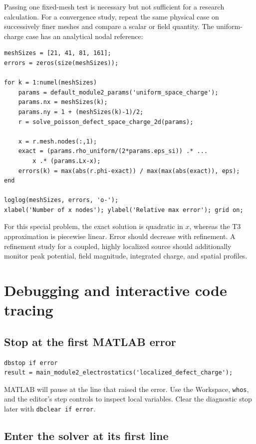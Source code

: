 \documentclass[11pt]{article}
\begin{document}
Passing one fixed-mesh test is necessary but not sufficient for a research calculation. For a convergence study, repeat the same physical case on successively finer meshes and compare a scalar or field quantity. The uniform-charge case has an analytical nodal reference:
\begin{lstlisting}[style=projectmatlab]
meshSizes = [21, 41, 81, 161];
errors = zeros(size(meshSizes));

for k = 1:numel(meshSizes)
    params = default_module2_params('uniform_space_charge');
    params.nx = meshSizes(k);
    params.ny = 1 + (meshSizes(k)-1)/2;
    r = solve_poisson_defect_space_charge_2d(params);

    x = r.mesh.nodes(:,1);
    exact = (params.rho_uniform/(2*params.eps_si)) .* ...
        x .* (params.Lx-x);
    errors(k) = max(abs(r.phi-exact)) / max(max(abs(exact)), eps);
end

loglog(meshSizes, errors, 'o-');
xlabel('Number of x nodes'); ylabel('Relative max error'); grid on;
\end{lstlisting}
For this special problem, the exact solution is quadratic in $x$, whereas the T3 approximation is piecewise linear. Error should decrease with refinement. A refinement study for a coupled, highly localized source should additionally monitor peak potential, field magnitude, integrated charge, and spatial profiles.

\section{Debugging and interactive code tracing}

\subsection{Stop at the first MATLAB error}

\begin{lstlisting}[style=projectmatlab]
dbstop if error
result = main_module2_electrostatics('localized_defect_charge');
\end{lstlisting}
MATLAB will pause at the line that raised the error. Use the Workspace, \texttt{whos}, and the editor's step controls to inspect local variables. Clear the diagnostic stop later with \texttt{dbclear if error}.

\subsection{Enter the solver at its first line}
\end{document}
